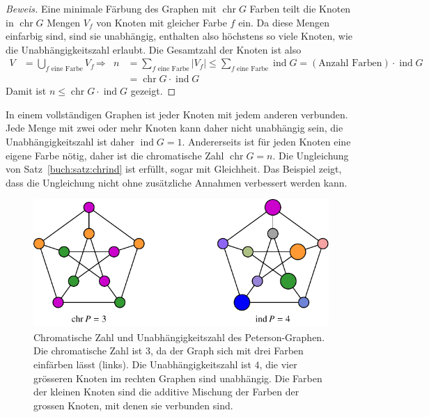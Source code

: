 \begin{proof}[Beweis]
Eine minimale Färbung des Graphen mit $\operatorname{chr}G$ Farben
teilt die Knoten in $\operatorname{chr}G$ Mengen $V_f$ von Knoten mit
gleicher Farbe $f$ ein.
Da diese Mengen einfarbig sind, sind sie unabhängig, enthalten also
höchstens so viele Knoten, wie die Unabhängigkeitszahl erlaubt.
Die Gesamtzahl der Knoten ist also
\begin{align*}
V
&=
\bigcup_{\text{$f$ eine Farbe}} V_f
&&\Rightarrow&
n
&=
\sum_{\text{$f$ eine Farbe}} |V_f| 
\le
\sum_{\text{$f$ eine Farbe}} \operatorname{ind}G
=
(\text{Anzahl Farben})\cdot \operatorname{ind}G
\\
&
&&&
&=
\operatorname{chr}G \cdot \operatorname{ind}G
\end{align*}
Damit ist $n\le \operatorname{chr}G\cdot\operatorname{ind}G$ gezeigt.
\qedhere
\end{proof}

\begin{beispiel}
In einem vollständigen Graphen ist jeder Knoten mit jedem anderen verbunden.
Jede Menge mit zwei oder mehr Knoten kann daher nicht unabhängig sein, die
Unabhängigkeitszahl ist daher $\operatorname{ind}G=1$.
Andererseits ist für jeden Knoten eine eigene Farbe nötig, daher ist die
chromatische Zahl $\operatorname{chr}G=n$.
Die Ungleichung von Satz~\ref{buch:satz:chrind} ist erfüllt, sogar mit
Gleichheit.
Das Beispiel zeigt, dass die Ungleichung nicht ohne zusätzliche Annahmen
verbessert werden kann.
\end{beispiel}

\begin{figure}
\centering
\includegraphics{chapters/70-graphen/images/petersonchrind.pdf}
\caption{Chromatische Zahl und Unabhängigkeitszahl des Peterson-Graphen.
Die chromatische Zahl ist $3$, da der Graph sich mit drei Farben einfärben
lässt (links).
Die Unabhängigkeitszahl ist $4$, die vier grösseren Knoten im rechten
Graphen sind unabhängig.
Die Farben der kleinen Knoten sind die additive Mischung der Farben
der grossen Knoten, mit denen sie verbunden sind.
\label{buch:graphen:fig:chrindpeterson}}
\end{figure}

